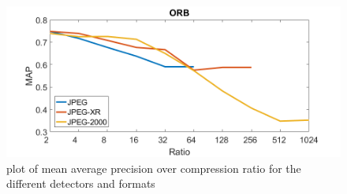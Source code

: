 \documentclass[10pt,a4paper,twocolumn]{article}
\begin{document}
\begin{figure}[h]
	\includegraphics[width = \textwidth]{img/orb_map.png}
	\caption{plot of mean average precision over compression ratio for the different detectors and formats}
\end{figure}


 
\end{document}
